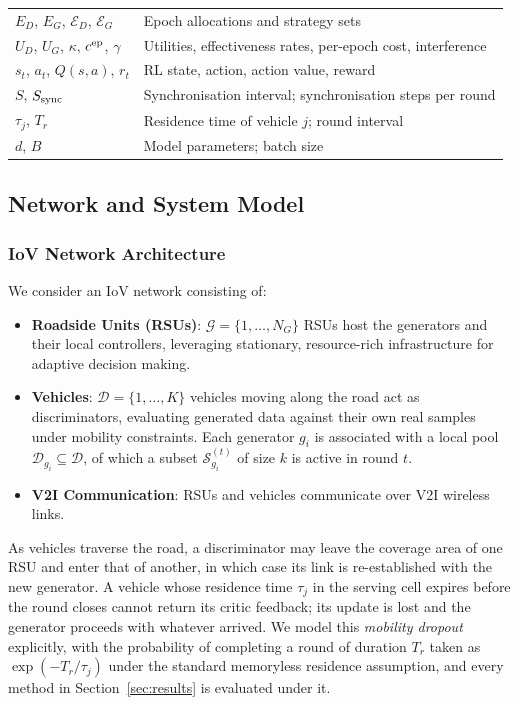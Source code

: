 \documentclass[journal]{IEEEtran}
\begin{document}
\begin{table}[!t]
\begin{tabular}{ll}
$E_D$, $E_G$, $\mathcal{E}_D$, $\mathcal{E}_G$ & Epoch allocations and strategy sets \\
$U_D$, $U_G$, $\kappa$, $c^{\rm ep}$, $\gamma$ & Utilities, effectiveness rates, per-epoch cost, interference \\
$s_t$, $a_t$, $Q(s,a)$, $r_t$ & RL state, action, action value, reward \\
$S$, $S_{\rm sync}$ & Synchronisation interval; synchronisation steps per round \\
$\tau_j$, $T_r$ & Residence time of vehicle $j$; round interval \\
$d$, $B$ & Model parameters; batch size \\
\bottomrule
\end{tabular}
\end{table}

\subsection{Network and System Model}
\subsubsection{IoV Network Architecture}
We consider an IoV network consisting of:
\begin{itemize}
\item \textbf{Roadside Units (RSUs)}: $\mathcal{G}=\{1,\ldots,N_G\}$ RSUs host
      the generators and their local controllers, leveraging stationary,
      resource-rich infrastructure for adaptive decision making.
\item \textbf{Vehicles}: $\mathcal{D}=\{1,\ldots,K\}$ vehicles moving along the
      road act as discriminators, evaluating generated data against their own
      real samples under mobility constraints. Each generator $g_i$ is
      associated with a local pool $\mathcal{D}_{g_i}\subseteq\mathcal{D}$, of
      which a subset $\mathcal{S}^{(t)}_{g_i}$ of size $k$ is active in round $t$.
\item \textbf{V2I Communication}: RSUs and vehicles communicate over V2I
      wireless links.
\end{itemize}
As vehicles traverse the road, a discriminator may leave the coverage area of
one RSU and enter that of another, in which case its link is re-established
with the new generator. A vehicle whose residence time $\tau_j$ in the serving
cell expires before the round closes cannot return its critic feedback; its
update is lost and the generator proceeds with whatever arrived. We model this
\emph{mobility dropout} explicitly, with the probability of completing a round
of duration $T_r$ taken as $\exp(-T_r/\tau_j)$ under the standard memoryless
residence assumption, and every method in Section~\ref{sec:results} is
evaluated under it.
\end{document}

